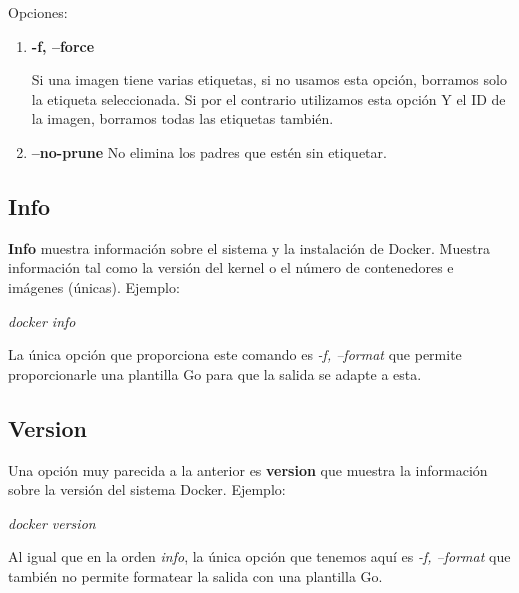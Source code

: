 \documentclass[]{article}
\begin{document}
Opciones:

\begin{enumerate}
\renewcommand{\labelenumi}{$\bullet$}
\item \textbf{-f, --force}

Si una imagen tiene varias etiquetas, si no usamos esta opción, borramos solo la etiqueta seleccionada.
Si por el contrario utilizamos esta opción Y el ID de la imagen, borramos todas las etiquetas también.

\item \textbf{--no-prune}
No elimina los padres que estén sin etiquetar.
\end{enumerate}


\subsection{Info}
\textbf{Info} muestra información sobre el sistema y la instalación de Docker.
Muestra información tal como la versión del kernel o el número de contenedores e imágenes (únicas).
Ejemplo:

\begin{center}
	\it
	docker info
\end{center}

La única opción que proporciona este comando es \textit{-f, --format} que permite proporcionarle una plantilla Go para que la salida se adapte a esta.


\subsection{Version}
Una opción muy parecida a la anterior es \textbf{version} que muestra la información sobre la versión del sistema Docker.
Ejemplo:
\begin{center}
	\it
	docker version
\end{center}

Al igual que en la orden \textit{info}, la única opción que tenemos aquí es \textit{-f, --format} que también no permite
formatear la salida con una plantilla Go.
\end{document}

